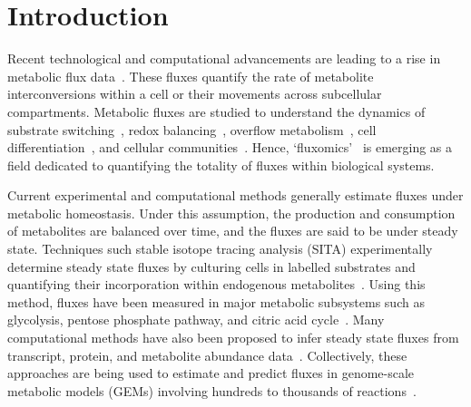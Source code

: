 \documentclass[12pt]{article}
\begin{document}
\clearpage

\section*{Introduction} %

Recent technological and computational advancements are leading to a rise in
metabolic flux
data~\citep{LeeWonDong2019Spas,WangLin2022Srit,WangRuohong2022Gstm}. These
fluxes quantify the rate of metabolite interconversions within a cell or their
movements across subcellular compartments. Metabolic fluxes are studied to
understand the dynamics of substrate
switching~\citep{ZampieriMattia2012Rmuc,KochanowskiKarl2021Gcom}, redox
balancing~\citep{McKinlayJamesB2010Cdfa,FranchinaDavideG2022Grbc}, overflow
metabolism~\citep{BasanMarkus2015OmiE,VanderHeidenMatthewG2009UtWE}, cell
differentiation~\citep{EndoYusuke2022Fami,BenjaminJacksonT2024Mrot}, and
cellular
communities~\citep{SchuetzRobert2012MOoM,YuJasonSL2022Mcfr,Gustafsson2024Mcbc}.
Hence, `fluxomics'~\citep{EmwasAbdul-Hamid2022F-NM,SanfordKarl2002Gtfa} is
emerging as a field dedicated to quantifying the totality of fluxes within
biological systems.

Current experimental and computational methods generally estimate fluxes
under metabolic homeostasis. Under this assumption, the production and
consumption of metabolites are balanced over time, and the fluxes are said
to be under steady state. Techniques such stable isotope tracing analysis
(SITA) experimentally determine steady state fluxes by culturing cells in
labelled substrates and quantifying their incorporation within endogenous
metabolites~\citep{BuescherJoergM2015Arfi,AntoniewiczMaciekR2018Agt1}.
Using this method, fluxes have been measured in major metabolic subsystems
such as glycolysis, pentose phosphate pathway, and citric acid
cycle~\citep{OrthJeffreyD2010RaUo,AhnEunyong2017Tfro,WuChao2019FARC}. Many
computational methods have also been proposed to infer steady state fluxes
from transcript, protein, and metabolite abundance
data~\citep{UematsuSaori2022Mlmf,GonzalezArrueNicolas2023Peom,HuangYuefan2023Ccmf,KasteJoshuaAM2023Afpu,LeeJustinY2023Tiac}.
Collectively, these approaches are being used to estimate and predict
fluxes in genome-scale metabolic models (GEMs) involving hundreds to
thousands of
reactions~\citep{NilssonAvlant2020Qaoa,CherkaouiSarah2022Afao,GelbachPatrickE2024Fsig}.
\end{document}

